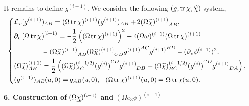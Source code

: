 It remains to define $g^{(i+1)}$. We consider the following $(g,\operatorname{tr}\chi,\widehat\chi)$ system,
\begin{equation}
    \left\{
    \begin{aligned}
        &\Lie_v(g^{(i+1)})_{AB}=(\Omega\tr\chi)^{(i+1)}(g^{(i+1)})_{AB}+2{(\Omega\chih)^{(i+1)}}_{AB},\\
        &\partial_v\left(\Omega\tr\chi\right)^{(i+1)}=-\frac{1}{2}\left((\Omega\tr\chi)^{(i+1)}\right)^2-4(\Omega\omega)^{(i+1)}(\Omega\tr\chi)^{(i+1)}\\
        &\qquad\qquad- {(\Omega\chih)^{(i+1)}}_{AB}{(\Omega\chih)^{(i+1)}}_{CD}{g^{(i+1)}}^{AC}{g^{(i+1)}}^{BD}-(\partial_v\phi^{(i+1)})^2,\\
        &(\Omega\chih)^{(i+1)}_{AB}=\frac{1}{2}\left((\Omega\chih)^{(i+1/2)}_{AC}{(g^{(i)})}^{CD}{g^{(i+1)}}_{DB}
        +(\Omega\chih)^{(i+1/2)}_{BC}{(g^{(i)})}^{CD}{g^{(i+1)}}_{DA}\right),\\
        &(g^{(i+1)})_{AB}(u,0)=g_{AB}(u,0),\ \ (\Omega\tr\chi)^{(i+1)}(u,0)=\Omega\tr\chi(u,0).
    \end{aligned}
    \right.
\end{equation}

\noindent\textbf{6. Construction of $(\Omega\underline\chi)^{(i+1)}$ and $(\Omega e_3\phi)^{(i+1)}$}

